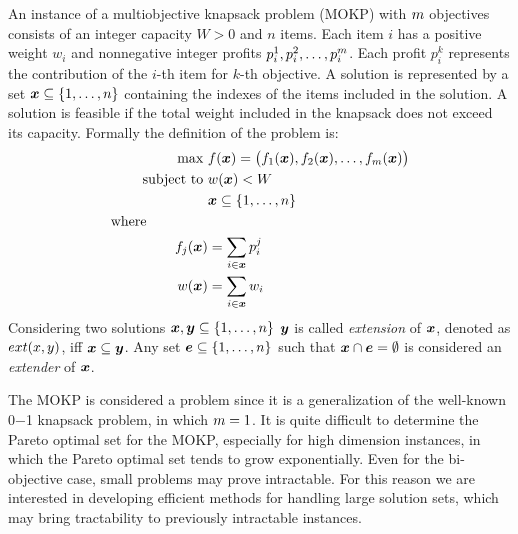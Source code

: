 An instance of a multiobjective knapsack problem (MOKP) with $m$
objectives consists of an integer capacity $W > 0$ and $n$ items.
Each item $i$ has a positive weight $w_i$ and nonnegative integer
profits $p_i^1, p_i^2, \ldots, p_{i}^{m}$.
Each profit $p_i^k$ represents the contribution of the $i$-th item for $k$-th objective.
A solution is represented by a set $\boldsymbol{x} \subseteq \{1, \ldots, n\}$
containing the indexes of the items included in the solution.
A solution is feasible if the total weight included in the knapsack does
not exceed its capacity.
Formally the definition of the problem is:
\begin{align*}
  \text{max   } & f(\boldsymbol{x}) = 
    \big(f_1(\boldsymbol{x}) ,f_2(\boldsymbol{x}) ,\ldots ,f_{m}(\boldsymbol{x})\big) \\
  \text{subject to   } & w(\boldsymbol{x}) < W \\
  & \boldsymbol{x} \subseteq \{1, \ldots, n\}\\
  \text{where} \phantom{mmmmm} \\
  f_j(\boldsymbol{x}) &= \sum_{i \in \boldsymbol{x}} p^j_i\\
  w(\boldsymbol{x}) &= \sum_{i \in \boldsymbol{x}} w_i
\end{align*}
Considering two solutions $\boldsymbol{x}, \boldsymbol{y} \subseteq \{1, \ldots, n\}$ $\boldsymbol{y}$ is
called \emph{extension} of $\boldsymbol{x}$, denoted as $ext(x, y)$,
iff $\boldsymbol{x} \subseteq \boldsymbol{y}$.
Any set $\boldsymbol{e} \subseteq \{1, \ldots, n\}$ such that $\boldsymbol{x} \cap \boldsymbol{e} = \emptyset$
is considered an \emph{extender} of $\boldsymbol{x}$.

The MOKP is considered a \nphard{} problem since it is a generalization
of the well-known 0$-$1 knapsack problem, in which $m = 1$.
It is quite difficult to determine the Pareto optimal set for the MOKP,
especially for high dimension instances, in which the 
Pareto optimal set tends to grow exponentially.
Even for the bi-objective case, small problems may prove intractable.
For this reason we are interested in developing efficient methods for
handling large solution sets, which may bring tractability to previously
intractable instances.

